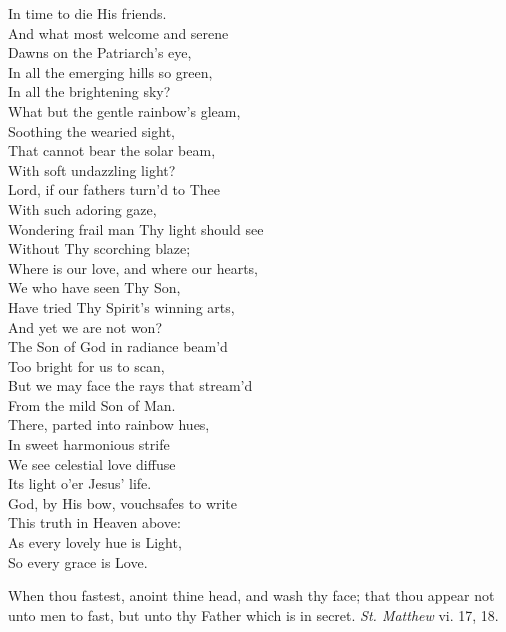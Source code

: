  In time to die His friends. \\
  And what most welcome and serene \\
 Dawns on the Patriarch’s eye, \\
 In all the emerging hills so green, \\
 In all the brightening sky? \\
  What but the gentle rainbow’s gleam, \\
 Soothing the wearied sight, \\
 That cannot bear the solar beam, \\
 With soft undazzling light? \\
  Lord, if our fathers turn’d to Thee \\
 With such adoring gaze, \\
 Wondering frail man Thy light should see \\
 Without Thy scorching blaze; \\
  Where is our love, and where our hearts, \\
 We who have seen Thy Son, \\
 Have tried Thy Spirit’s winning arts, \\
 And yet we are not won? \\
  The Son of God in radiance beam’d \\
 Too bright for us to scan, \\
 But we may face the rays that stream’d \\
 From the mild Son of Man. \\
  There, parted into rainbow hues, \\
 In sweet harmonious strife \\
 We see celestial love diffuse \\
 Its light o’er Jesus’ life. \\
  God, by His bow, vouchsafes to write \\
 This truth in Heaven above: \\
 As every lovely hue is Light, \\
 So every grace is Love.\\


When thou fastest, anoint thine head, and wash thy face; that thou appear not unto men to fast, but unto thy Father which is in secret. \emph{St. Matthew} vi. 17, 18.

